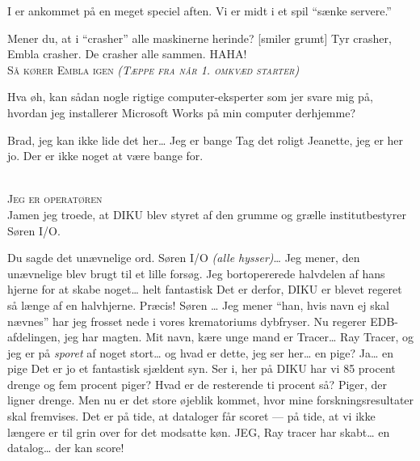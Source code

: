 \documentclass[10pt]{article}
\begin{document}
\begin{sketch}

   I er ankommet på en meget speciel aften. Vi er midt i et spil
``sænke servere.''

   Mener du, at i ``crasher'' alle maskinerne herinde?
   [smiler grumt] Tyr crasher, Embla crasher. De crasher alle sammen. HAHA!
\\
 \textsc{Så kører Embla igen \emph{(Tæppe fra når 1. omkvæd starter)}}
\\

   Hva øh, kan sådan nogle rigtige computer-eksperter som jer svare mig
på, hvordan jeg installerer Microsoft Works på min computer derhjemme?


  Brad, jeg kan ikke lide det her\ldots{} Jeg er bange
   Tag det roligt Jeanette, jeg er her jo. Der er ikke noget at være
bange for.

\\
 \textsc{Jeg er operatøren}
\\
   Jamen jeg troede, at DIKU blev styret af den grumme og grælle
institutbestyrer Søren I/O.


    Du sagde det unævnelige ord. Søren I/O \emph{(alle hysser)}\ldots{} Jeg mener,
den unævnelige blev brugt til et lille forsøg. Jeg bortopererede
halvdelen af hans hjerne for at skabe noget\ldots{} helt fantastisk 
   Det er derfor, DIKU er blevet regeret så længe af en halvhjerne.
    Præcis! Søren \ldots{} Jeg mener ``han, hvis navn ej skal nævnes'' har jeg
frosset nede i vores krematoriums dybfryser. Nu regerer EDB-afdelingen, jeg
har magten. Mit navn, kære unge mand er Tracer\ldots{} Ray Tracer, og jeg er
på \emph{sporet} af noget stort\ldots{} og hvad er dette, jeg ser her\ldots{} en
pige? 
   Ja\ldots{} en pige 
    Det er jo et fantastisk sjældent syn. Ser i, her på DIKU
har vi 85 procent drenge og fem procent piger?
   Hvad er de resterende ti procent så?
    Piger, der ligner drenge. Men nu er det store øjeblik kommet, hvor
mine forskningsresultater skal fremvises. Det er på tide, at dataloger får
scoret --- på tide, at vi ikke længere er til grin over for det modsatte køn.
JEG, Ray tracer har skabt\ldots{} en datalog\ldots{} der kan score!


\end{sketch}
\end{document}

